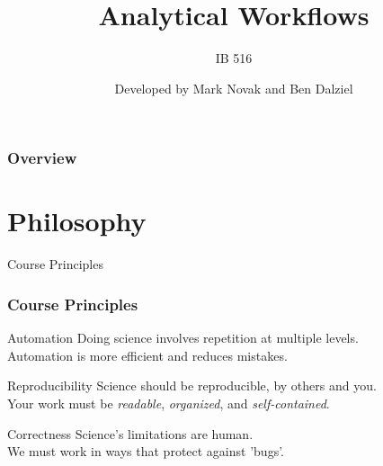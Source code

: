 \documentclass{beamer}
\title[Analytical Workflows] %
{Analytical Workflows}
\subtitle{IB 516}
\author[] %
{Developed by Mark Novak and Ben Dalziel}
\institute[OSU] %
{
  \inst{}%
  Dept. of Integrative Biology\\
  Oregon State University
}
\date[Fall2021] %
{}
\begin{document}
\frame{\titlepage}

\begin{frame}
    \frametitle{Overview}
    \tableofcontents
\end{frame}


\section{Philosophy}


\begin{frame}{Course Principles}

    \frametitle{Course Principles}

        \begin{block}{Automation}
            Doing science involves repetition at multiple levels.\\Automation is more efficient and reduces mistakes.
        \end{block}

        \begin{block}{Reproducibility}
            Science should be reproducible, by others and you.\\Your work must be \emph{readable}, \emph{organized}, and \emph{self-contained}.
        \end{block}

        \begin{block}{Correctness}
            Science's limitations are human. \\We must work in ways that protect against 'bugs'.
        \end{block}


\end{frame}
\end{document}
